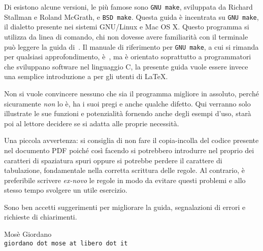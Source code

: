 Di  esistono alcune versioni, le più famose sono
\texttt{GNU make}, sviluppata da Richard Stallman e Roland McGrath, e
\texttt{BSD make}.  Questa guida è incentrata su \texttt{GNU make}, il dialetto
presente nei sistemi GNU/Linux e Mac OS X.  Questo programma si utilizza da
linea di comando, chi non dovesse avere familiarità con il terminale può leggere
la guida di~\cite{giacomelli:console}.  Il manuale di riferimento per
\texttt{GNU make}, a cui si rimanda per qualsiasi approfondimento,
è~\cite{gnu:make}, ma è orientato soprattutto a programmatori che sviluppano
software nel linguaggio C, la presente guida vuole essere invece una semplice
introduzione a  per gli utenti di \LaTeX{}.

Non si vuole convincere nessuno che  sia il programma migliore
in assoluto, perché sicuramente \emph{non} lo è, ha i suoi pregi e anche qualche
difetto.  Qui verranno solo illustrate le sue funzioni e potenzialità fornendo
anche degli esempi d'uso, starà poi al lettore decidere se  si
adatta alle proprie necessità.

Una piccola avvertenza: si consiglia di non fare il copia-incolla del codice
presente nel documento \textsc{PDF} poiché così facendo si potrebbero introdurre
nel proprio  dei caratteri di spaziatura spuri oppure si
potrebbe perdere il carattere di tabulazione, fondamentale nella corretta
scrittura delle regole.  Al contrario, è preferibile scrivere \emph{ex-novo} le
regole in modo da evitare questi problemi e allo stesso tempo svolgere un utile
esercizio.

Sono ben accetti suggerimenti per migliorare la guida, segnalazioni di errori e
richieste di chiarimenti.

\begin{flushright}
\begin{minipage}{0.6\textwidth}\centering
Mosè Giordano \\
\texttt{giordano dot mose at libero dot it}
\end{minipage}
\end{flushright}

